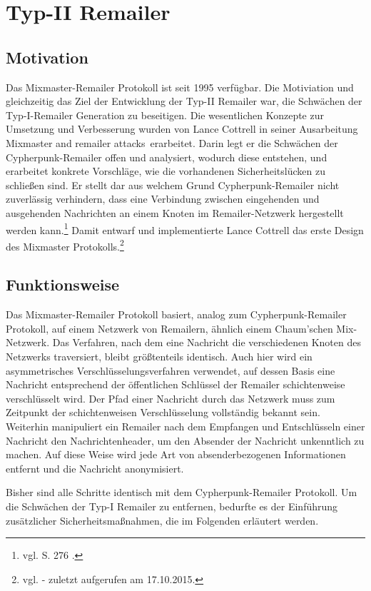 \chapter{Typ-II Remailer}
\section{Motivation}
Das Mixmaster-Remailer Protokoll ist seit 1995 verfügbar. Die Motiviation und gleichzeitig das Ziel der Entwicklung der Typ-II Remailer war, die Schwächen der Typ-I-Remailer Generation zu beseitigen. Die wesentlichen Konzepte zur Umsetzung und Verbesserung wurden von Lance Cottrell in seiner Ausarbeitung \glqq Mixmaster and remailer attacks\grqq ~erarbeitet. Darin legt er die Schwächen der Cypherpunk-Remailer offen und analysiert, wodurch diese entstehen, und erarbeitet konkrete Vorschläge, wie die vorhandenen Sicherheitslücken zu schließen sind. Er stellt dar aus welchem Grund Cypherpunk-Remailer nicht zuverlässig verhindern, dass eine Verbindung zwischen eingehenden und ausgehenden Nachrichten an einem Knoten im Remailer-Netzwerk hergestellt werden kann.\footnote{vgl. S. 276 \cite{oram2001peer}.} Damit entwarf und implementierte Lance Cottrell das erste Design des Mixmaster Protokolls.\footnote{vgl. \cite{mixmastermanpage} - zuletzt aufgerufen am 17.10.2015.}

\section{Funktionsweise}
Das Mixmaster-Remailer Protokoll basiert, analog zum Cypherpunk-Remailer Protokoll, auf einem Netzwerk von Remailern, ähnlich einem Chaum'schen Mix-Netzwerk. Das Verfahren, nach dem eine Nachricht die verschiedenen Knoten des Netzwerks traversiert, bleibt größtenteils identisch. Auch hier wird ein asymmetrisches Verschlüsselungsverfahren verwendet, auf dessen Basis eine Nachricht entsprechend der öffentlichen Schlüssel der Remailer schichtenweise verschlüsselt wird. Der Pfad einer Nachricht durch das Netzwerk muss zum Zeitpunkt der schichtenweisen Verschlüsselung vollständig bekannt sein. Weiterhin manipuliert ein Remailer nach dem Empfangen und Entschlüsseln einer Nachricht den Nachrichtenheader, um den Absender der Nachricht unkenntlich zu machen. Auf diese Weise wird jede Art von absenderbezogenen Informationen entfernt und die Nachricht anonymisiert. 

Bisher sind alle Schritte identisch mit dem Cypherpunk-Remailer Protokoll. Um die Schwächen der Typ-I Remailer zu entfernen, bedurfte es der Einführung zusätzlicher Sicherheitsmaßnahmen, die im Folgenden erläutert werden.

